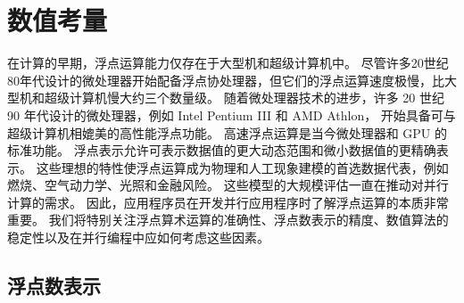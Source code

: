 \section{数值考量}
在计算的早期，浮点运算能力仅存在于大型机和超级计算机中。 
尽管许多20世纪80年代设计的微处理器开始配备浮点协处理器，但它们的浮点运算速度极慢，比大型机和超级计算机慢大约三个数量级。 
随着微处理器技术的进步，许多 20 世纪 90 年代设计的微处理器，例如 Intel Pentium III 和 AMD Athlon，
开始具备可与超级计算机相媲美的高性能浮点功能。 高速浮点运算是当今微处理器和 GPU 的标准功能。 
浮点表示允许可表示数据值的更大动态范围和微小数据值的更精确表示。 
这些理想的特性使浮点运算成为物理和人工现象建模的首选数据代表，例如燃烧、空气动力学、光照和金融风险。 
这些模型的大规模评估一直在推动对并行计算的需求。 因此，应用程序员在开发并行应用程序时了解浮点运算的本质非常重要。 
我们将特别关注浮点算术运算的准确性、浮点数表示的精度、数值算法的稳定性以及在并行编程中应如何考虑这些因素。

\subsection{浮点数表示}